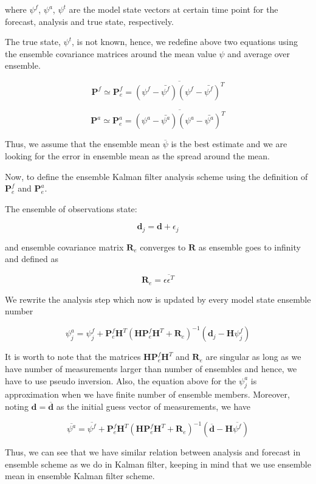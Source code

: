 \documentclass[a4,12pt]{article}
\numberwithin{equation}{section}
\begin{document}
where $\psi ^{f}$, $\psi ^{a}$, $\psi ^{t}$ are the model state vectors at certain time point for the forecast, analysis and true state, respectively.

The true state, $\psi ^{t}$, is not known, hence, we redefine above two equations using the ensemble covariance matrices around the mean value $\psi$ and average over ensemble. 

$$\textbf{P}^{f} \simeq \textbf{P}^{f}_{e} = \overline{(\psi^{f}-\bar{\psi^{f}})(\psi^{f}-\bar{\psi^{f}})^{T}}$$

$$\textbf{P}^{a} \simeq \textbf{P}^{a}_{e}= \overline{ (\psi^{a}-\bar {\psi^{a}})(\psi^{a}-\bar{\psi^{a}})^{T} }$$

Thus, we assume that the ensemble mean $\overline {\psi}$ is the best estimate  and we are looking for the error in ensemble mean as the spread around the mean.

Now, to define the ensemble Kalman filter analysis scheme using the definition of $\textbf{P}^{f}_{e}$ and $\textbf{P}^{a}_{e}$.

The ensemble of observations state:

$$\textbf{d}_{j} = \textbf{d} + \epsilon_{j}$$

and ensemble covariance matrix $\textbf{R}_{e}$ converges to $\textbf{R}$ as ensemble goes to infinity and defined as 

$$\textbf{R}_{e} = \overline{\epsilon \epsilon ^{T}}$$

We rewrite the analysis step which now is updated by every model state ensemble number

$$\psi ^{a} _{j}= \psi ^{f}_{j} + \textbf{P} _{e} ^{f}\textbf{H} ^{T}(\textbf{HP}_{e} ^{f}\textbf{H} ^{T}+\textbf{R}_{e}) ^{-1}(\textbf{d}_{j}-\textbf{H}\psi ^{f}_{j})$$

It is worth to note that the matrices $\textbf{H}\textbf{P}^{f}_{e}\textbf{H}^{T}$ and $\textbf{R}_{e}$ are singular as long as we have number of measurements larger than number of ensembles and hence, we have to use pseudo inversion. Also, the equation above for the $\psi ^{a} _{j}$ is approximation when we have finite number of ensemble members. Moreover, noting $\textbf{d} = \overline{\textbf{d}}$ as the initial guess vector of measurements, we have

$$\overline{\psi ^{a}} = \overline{\psi ^{f}} + \textbf{P} ^{f}_{e}\textbf{H} ^{T}(\textbf{HP}_{e} ^{f}\textbf{H} ^{T}+\textbf{R}_{e}) ^{-1}(\overline{\textbf{d}}-\textbf{H}\overline{\psi ^{f}})$$

Thus, we can see that we have similar relation between analysis and forecast in ensemble scheme as we do in Kalman filter, keeping in mind that we use ensemble mean in ensemble Kalman filter scheme.
\end{document}
